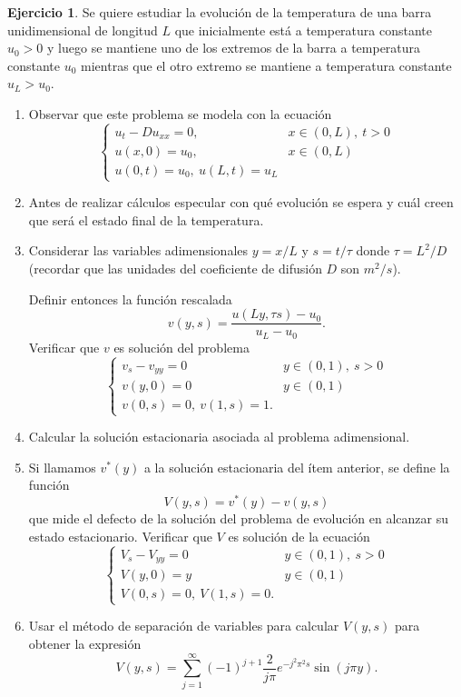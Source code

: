 \documentclass[12pt, a4paper]{amsbook}
\theoremstyle{remark}
\theoremstyle{definition}
\newtheorem{ejer}[teo]{Ejercicio}
\numberwithin{section}{chapter}
\numberwithin{subsection}{section}
\numberwithin{equation}{section}
\numberwithin{figure}{chapter}
\begin{document}
\begin{ejer}
Se quiere estudiar la evolución de la temperatura de una barra unidimensional de longitud $L$ que inicialmente está a temperatura constante $u_0>0$ y luego se mantiene uno de los extremos de la barra a temperatura constante $u_0$ mientras que el otro extremo se mantiene a temperatura constante $u_L>u_0$.

\begin{enumerate}
\item Observar que este problema se modela con la ecuación
$$
\begin{cases}
u_t - D u_{xx} = 0, & x\in (0,L),\ t>0\\
u(x,0)=u_0, & x\in (0,L)\\
u(0,t)=u_0,\ u(L,t)=u_L
\end{cases}
$$

\item Antes de realizar cálculos especular con qué evolución se espera y cuál creen que será el estado final de la temperatura.

\item Considerar las variables adimensionales $y=x/L$ y $s=t/\tau$ donde $\tau = L^2/D$ (recordar que las unidades del coeficiente de difusión $D$ son $m^2/s$).

Definir entonces la función rescalada 
$$
v(y,s)=\frac{u(Ly,\tau s)-u_0}{u_L-u_0}.
$$
Verificar que $v$ es solución del problema
$$\begin{cases}
v_s - v_{yy} = 0 & y\in (0,1),\ s>0\\
v(y,0)=0 & y\in (0,1)\\
v(0,s)=0,\ v(1,s)=1.
\end{cases}
$$

\item Calcular la solución estacionaria asociada al problema adimensional.

\item Si llamamos $v^*(y)$ a la solución estacionaria del ítem anterior, se define la función
$$
V(y,s) = v^*(y) - v(y,s)
$$ 
que mide el defecto de la solución del problema de evolución en alcanzar su estado estacionario. Verificar que $V$ es solución de la ecuación
$$\begin{cases}
V_s - V_{yy} = 0 & y\in (0,1),\ s>0\\
V(y,0)=y & y\in (0,1)\\
V(0,s)=0,\ V(1,s)=0.
\end{cases}
$$

\item Usar el método de separación de variables para calcular $V(y,s)$ para obtener la expresión
$$
V(y,s) = \sum_{j=1}^\infty (-1)^{j+1}\frac{2}{j\pi} e^{-j^2\pi^2 s} \sin(j\pi y).
$$


\end{enumerate}
\end{ejer}
\end{document}
